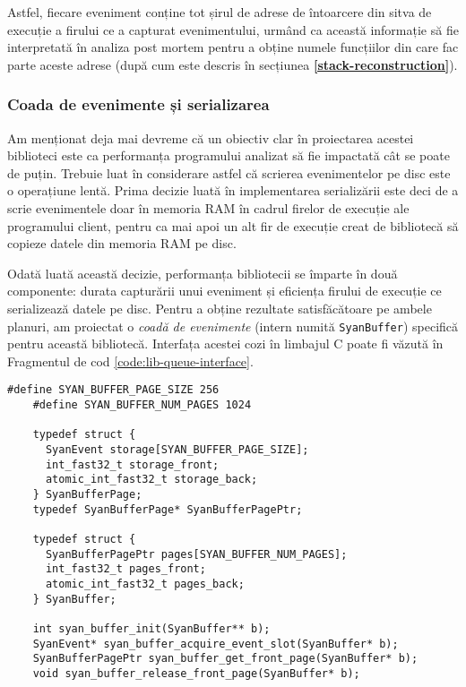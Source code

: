 Astfel, fiecare eveniment conține tot șirul de adrese de întoarcere din
sitva de execuție a firului ce a capturat evenimentului, urmând ca
această informație să fie interpretată în analiza post mortem pentru a
obține numele funcțiilor din care fac parte aceste adrese (după cum este
descris în secțiunea \textbf{\ref{stack-reconstruction}}).

\subsubsection{Coada de evenimente și serializarea}\label{section:queue}

Am menționat deja mai devreme că un obiectiv clar în proiectarea acestei
biblioteci este ca performanța programului analizat să fie impactată cât
se poate de puțin. Trebuie luat în considerare astfel că scrierea
evenimentelor pe disc este o operațiune lentă. Prima decizie luată în
implementarea serializării este deci de a scrie evenimentele doar în
memoria RAM în cadrul firelor de execuție ale programului client, pentru
ca mai apoi un alt fir de execuție creat de bibliotecă să copieze datele
din memoria RAM pe disc.

Odată luată această decizie, performanța bibliotecii se împarte în două
componente: durata capturării unui eveniment și eficiența firului de
execuție ce serializează datele pe disc. Pentru a obține rezultate
satisfăcătoare pe ambele planuri, am proiectat o
\textit{coadă de evenimente} (intern numită \lstinline{SyanBuffer})
specifică pentru această bibliotecă. Interfața acestei cozi în limbajul
C poate fi văzută în Fragmentul de cod \ref{code:lib-queue-interface}.

\begin{lstlisting}[caption=Interfața cozii de evenimente folosite în
                           bibliotecă,
                   label=code:lib-queue-interface]
    #define SYAN_BUFFER_PAGE_SIZE 256
    #define SYAN_BUFFER_NUM_PAGES 1024

    typedef struct {
      SyanEvent storage[SYAN_BUFFER_PAGE_SIZE];
      int_fast32_t storage_front;
      atomic_int_fast32_t storage_back;
    } SyanBufferPage;
    typedef SyanBufferPage* SyanBufferPagePtr;

    typedef struct {
      SyanBufferPagePtr pages[SYAN_BUFFER_NUM_PAGES];
      int_fast32_t pages_front;
      atomic_int_fast32_t pages_back;
    } SyanBuffer;

    int syan_buffer_init(SyanBuffer** b);
    SyanEvent* syan_buffer_acquire_event_slot(SyanBuffer* b);
    SyanBufferPagePtr syan_buffer_get_front_page(SyanBuffer* b);
    void syan_buffer_release_front_page(SyanBuffer* b);
\end{lstlisting}

